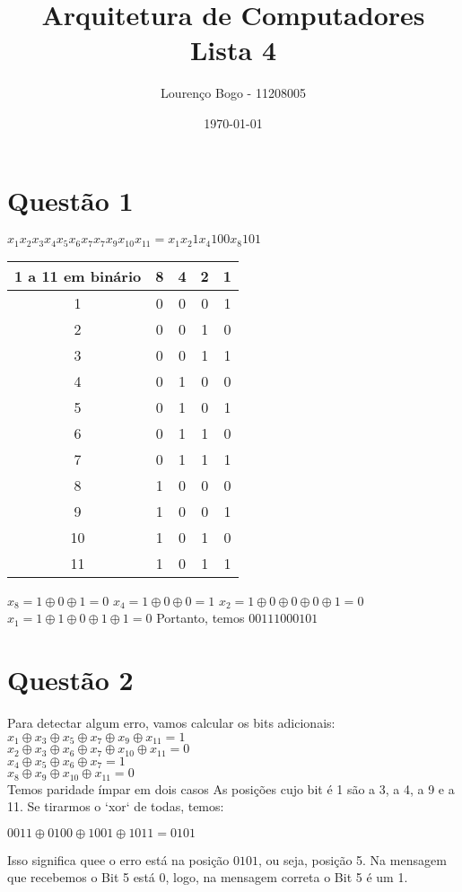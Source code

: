 \documentclass[11pt]{article}
\author{Lourenço Bogo - 11208005}
\date{\today}
\title{Arquitetura de Computadores Lista 4}
\begin{document}
\maketitle

\section{Questão 1}
\label{sec:orgb668271}
$x_{1}x_{2}x_{3}x_{4}x_{5}x_{6}x_{7}x_{7}x_{9}x_{10}x_{11} = x_{1}x_{2}1x_{4}100x_{8}101$
\begin{center}
\begin{tabular}{c | c c c c}
1 a 11 em binário & 8 & 4 & 2 & 1\\
\hline
1 & 0 & 0 & 0 & 1\\
2 & 0 & 0 & 1 & 0\\
3 & 0 & 0 & 1 & 1\\
4 & 0 & 1 & 0 & 0\\
5 & 0 & 1 & 0 & 1\\
6 & 0 & 1 & 1 & 0\\
7 & 0 & 1 & 1 & 1\\
8 & 1 & 0 & 0 & 0\\
9 & 1 & 0 & 0 & 1\\
10 & 1 & 0 & 1 & 0\\
11 & 1 & 0 & 1 & 1\\
\end{tabular}
\end{center}

\noindent$x_{8} = 1 \oplus 0 \oplus 1 = 0$\newline
$x_{4} = 1 \oplus 0 \oplus 0 = 1$\newline
$x_{2} = 1 \oplus 0 \oplus 0 \oplus 0 \oplus 1 = 0$\newline
$x_{1} = 1 \oplus 1 \oplus 0 \oplus 1 \oplus 1 = 0$\newline
Portanto, temos
$00111000101$

\section{Questão 2}
\label{sec:orge00684b}
Para detectar algum erro, vamos calcular os bits adicionais:\\
$x_{1} \oplus x_{3} \oplus x_{5} \oplus x_{7} \oplus x_{9} \oplus x_{11} = 1$ \\
$x_{2} \oplus x_{3} \oplus x_{6} \oplus x_{7} \oplus x_{10} \oplus x_{11} = 0$ \\
$x_{4} \oplus x_{5} \oplus x_{6} \oplus x_{7} = 1$ \\
$x_{8} \oplus x_{9} \oplus x_{10} \oplus x_{11} = 0$ \\
Temos paridade ímpar em dois casos
As posições cujo bit é 1 são a 3, a 4, a 9 e a 11. Se tirarmos o `xor` de todas, temos:

$0011 \oplus 0100 \oplus 1001 \oplus 1011 = 0101$

Isso significa quee o erro está na posição \(0101\), ou seja, posição 5. Na mensagem que recebemos
o Bit 5 está 0, logo, na mensagem correta o Bit 5 é um 1.
\end{document}
